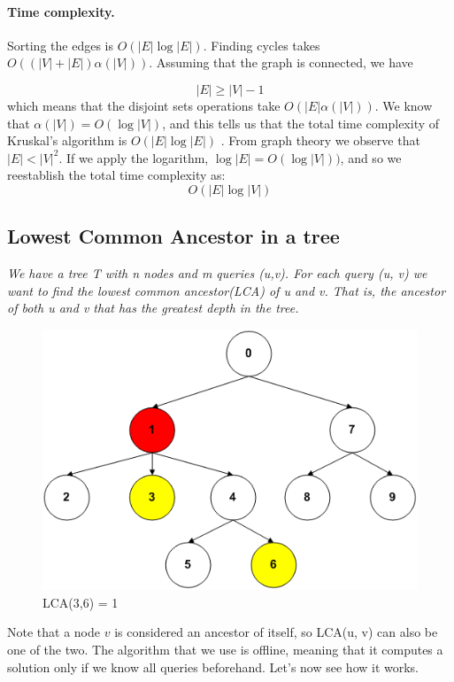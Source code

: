 \documentclass{article}
\begin{document}
\paragraph{Time complexity.} Sorting the edges is $O(|E|\log|E|)$. Finding cycles takes
$O((|V| + |E|)\alpha(|V|))$. Assuming that the graph is connected, we have

 $$|E| \geq |V| - 1$$ which means that the disjoint sets operations take $O(|E|\alpha(|V|))$. We know that
 $\alpha(|V|) = O(\log|V|)$, and this tells us that the total time complexity of Kruskal's algorithm
 is $O(|E|\log|E|)$ \cite{cormen2009introduction}. From graph theory we observe that $|E| < |V|^2$. If we apply the logarithm,
 $\log|E| = O(\log|V|))$, and so we reestablish the total time complexity as:
 $$O(|E|\log|V|)$$


\subsection{Lowest Common Ancestor in a tree}
\emph{We have a tree T with  n nodes and m queries (u,v). For each query (u, v) we want to find
the lowest common ancestor(LCA) of u and v. That is, the ancestor of both u and v that has the greatest depth in the tree.
}
\begin{figure}[h!]
    \centering
    \includegraphics[scale = 0.5]{img/lca1.png}
    \caption{LCA(3,6) = 1}
\end{figure}

 \bigskip
 Note that a node $v$ is considered an ancestor of itself, so LCA(u, v) can also be one of the two.
 The algorithm that we use is offline, meaning that it computes a solution only if we know
 all queries beforehand. Let's now see how it works. 
 
\end{document}
